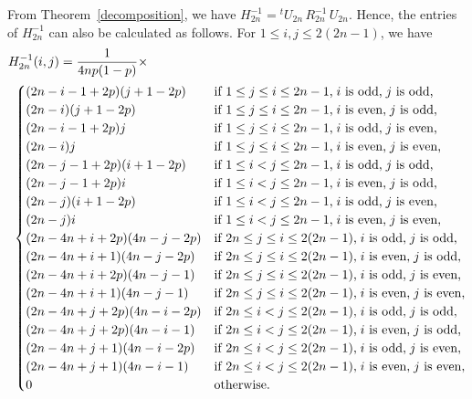 \documentclass[12pt, leqno]{amsart}
\numberwithin{equation}{section}
\theoremstyle{plain}
\theoremstyle{definition}
\newcommand{\0}{\mathbf{0}}
\begin{document}
From Theorem~\ref{decomposition}, we have $H_{2n}^{-1}={}^tU_{2n}\,R_{2n}^{-1}\,U_{2n}$. 
Hence, the entries of $H^{-1}_{2n}$ can also be calculated as follows. 
For $1\leq i,j\leq 2(2n-1)$, we have 
\begin{align*}
&H_{2n}^{-1}(i,j)=\frac{1}{4np(1-p)}\times\\
&~\begin{cases}
(2n-i-1+2p)(j+1-2p) &\text{if $1\leq j\leq i\leq 2n-1$,\;$i$ is odd,\;$j$ is odd,}\\
(2n-i)(j+1-2p) &\text{if $1\leq j\leq i\leq 2n-1$,\;$i$ is even,\;$j$ is odd,}\\
(2n-i-1+2p)j &\text{if $1\leq j\leq i\leq 2n-1$,\;$i$ is odd,\;$j$ is even,}\\
(2n-i)j &\text{if $1\leq j\leq i\leq 2n-1$,\;$i$ is even,\;$j$ is even,}\\
(2n-j-1+2p)(i+1-2p) &\text{if $1\leq i< j\leq 2n-1$,\;$i$ is odd,\;$j$ is odd,}\\
(2n-j-1+2p)i &\text{if $1\leq i< j\leq 2n-1$,\;$i$ is even,\;$j$ is odd,}\\
(2n-j)(i+1-2p) &\text{if $1\leq i< j\leq 2n-1$,\;$i$ is odd,\;$j$ is even,}\\
(2n-j)i &\text{if $1\leq i< j\leq 2n-1$,\;$i$ is even,\;$j$ is even,}\\
(2n-4n+i+2p)(4n-j-2p) &\text{if $2n\leq j\leq i\leq 2(2n-1)$,\;$i$ is odd,\;$j$ is odd,}\\
(2n-4n+i+1)(4n-j-2p) &\text{if $2n\leq j\leq i\leq 2(2n-1)$,\;$i$ is even,\;$j$ is odd,}\\
(2n-4n+i+2p)(4n-j-1)&\text{if $2n\leq j\leq i\leq 2(2n-1)$,\;$i$ is odd,\;$j$ is even,}\\
(2n-4n+i+1)(4n-j-1) &\text{if $2n\leq j\leq i\leq 2(2n-1)$,\;$i$ is even,\;$j$ is even,}\\
(2n-4n+j+2p)(4n-i-2p) &\text{if $2n\leq i<j\leq 2(2n-1)$,\;$i$ is odd,\;$j$ is odd,}\\
(2n-4n+j+2p)(4n-i-1) &\text{if $2n\leq i<j\leq 2(2n-1)$,\;$i$ is even,\;$j$ is odd,}\\
(2n-4n+j+1)(4n-i-2p) &\text{if $2n\leq i<j\leq 2(2n-1)$,\;$i$ is odd,\;$j$ is even,}\\
(2n-4n+j+1)(4n-i-1) &\text{if $2n\leq i<j\leq 2(2n-1)$,\;$i$ is even,\;$j$ is even,}\\
0 &\text{otherwise.}
\end{cases}
\end{align*}

\end{document}

